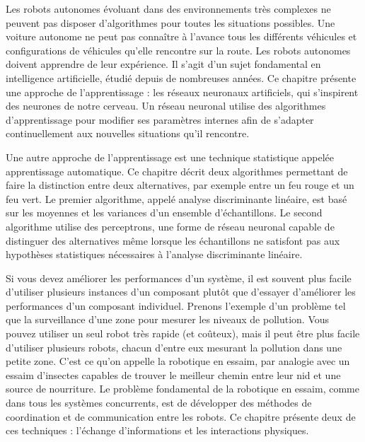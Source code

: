 {\begin{description}
\smallskip
\item [\textbf{Chapitre \ref{ch.neural} Réseaux neuronaux}] Les robots autonomes évoluant dans des environnements très complexes ne peuvent pas disposer d'algorithmes pour toutes les situations possibles. Une voiture autonome ne peut pas connaître à l'avance tous les différents véhicules et configurations de véhicules qu'elle rencontre sur la route. Les robots autonomes doivent apprendre de leur expérience. Il s'agit d'un sujet fondamental en intelligence artificielle, étudié depuis de nombreuses années. Ce chapitre présente une approche de l'apprentissage : les réseaux neuronaux artificiels, qui s'inspirent des neurones de notre cerveau. Un réseau neuronal utilise des algorithmes d'apprentissage pour modifier ses paramètres internes afin de s'adapter continuellement aux nouvelles situations qu'il rencontre.
\smallskip
\item [\textbf{Chapitre \ref{ch.machine} Apprentissage automatique}] Une autre approche de l'apprentissage est une technique statistique appelée apprentissage automatique. Ce chapitre décrit deux algorithmes permettant de faire la distinction entre deux alternatives, par exemple entre un feu rouge et un feu vert. Le premier algorithme, appelé analyse discriminante linéaire, est basé sur les moyennes et les variances d'un ensemble d'échantillons. Le second algorithme utilise des perceptrons, une forme de réseau neuronal capable de distinguer des alternatives même lorsque les échantillons ne satisfont pas aux hypothèses statistiques nécessaires à l'analyse discriminante linéaire.
\smallskip
\item [\textbf{Chapitre \ref{ch.swarm} Swarm Robotics}] Si vous devez améliorer les performances d'un système, il est souvent plus facile d'utiliser plusieurs instances d'un composant plutôt que d'essayer d'améliorer les performances d'un composant individuel. Prenons l'exemple d'un problème tel que la surveillance d'une zone pour mesurer les niveaux de pollution. Vous pouvez utiliser un seul robot très rapide (et coûteux), mais il peut être plus facile d'utiliser plusieurs robots, chacun d'entre eux mesurant la pollution dans une petite zone. C'est ce qu'on appelle la robotique en essaim, par analogie avec un essaim d'insectes capables de trouver le meilleur chemin entre leur nid et une source de nourriture. Le problème fondamental de la robotique en essaim, comme dans tous les systèmes concurrents, est de développer des méthodes de coordination et de communication entre les robots. Ce chapitre présente deux de ces techniques : l'échange d'informations et les interactions physiques.

\end{description}}
